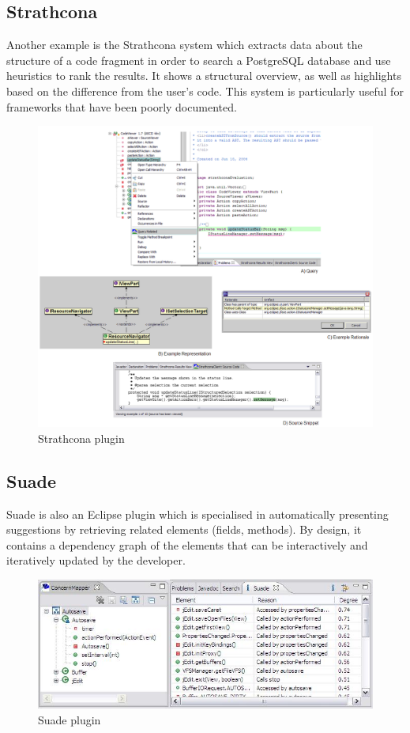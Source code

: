 \documentclass{l4proj}
\begin{document}
\subsection{Strathcona}
Another example is the Strathcona system which extracts data about the structure of a code fragment in order to search a PostgreSQL database and use heuristics to rank the results. It shows a structural overview, as well as highlights based on the difference from the user's code. This system is particularly useful for frameworks that have been poorly documented.

\begin{figure}[H]
\includegraphics[scale=0.4]{strathcona}
\centering
\caption{Strathcona plugin}\label{strathcona}
\label{fig:strathcona}
\end{figure}

\newpage
\subsection{Suade}
Suade is also an Eclipse plugin which is specialised in automatically presenting suggestions by retrieving related elements (fields, methods). By design, it contains a dependency graph of the elements that can be interactively and iteratively updated by the developer.

\begin{figure}[H]
\includegraphics[scale=0.9]{suade}
\centering
\caption{Suade plugin}\label{suade}
\label{fig:suade}
\end{figure}
\end{document}
